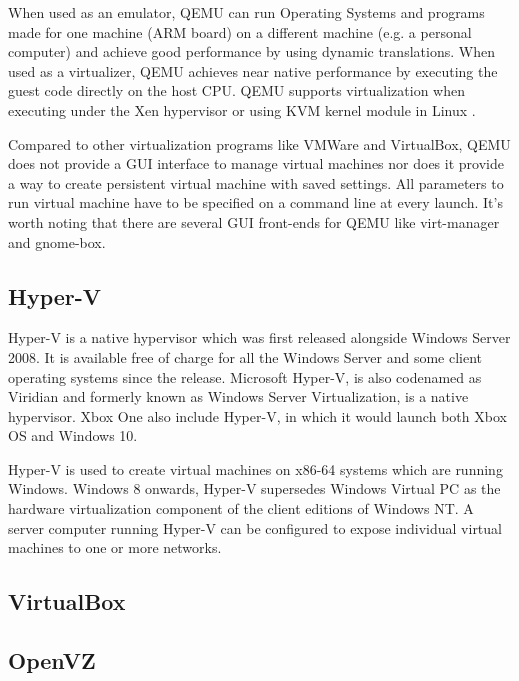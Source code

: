 {     When used as an emulator, QEMU can run Operating Systems and
     programs made for one machine (ARM board) on a different machine
     (e.g. a personal computer) and achieve good performance by using
     dynamic translations.  When used as a virtualizer, QEMU achieves
     near native performance by executing the guest code directly on
     the host CPU. QEMU supports virtualization when executing under
     the Xen hypervisor or using KVM kernel module in Linux
     \cite{www-qemuwiki}.

     Compared to other virtualization programs like VMWare and VirtualBox,
     QEMU does not provide a GUI interface to manage virtual machines nor
     does it provide a way to create persistent virtual machine with saved
     settings. All parameters to run virtual machine have to be specified
     on a command line at every launch. It’s worth noting that there are
     several GUI front-ends for QEMU like virt-manager and gnome-box.

     \pv

\subsection{Hyper-V \cv}
     
     Hyper-V is a native hypervisor which was first released alongside
     Windows Server 2008. It is available free of charge for all the
     Windows Server and some client operating systems since the
     release. Microsoft Hyper-V, is also codenamed as Viridian and
     formerly known as Windows Server Virtualization, is a native
     hypervisor. Xbox One also include Hyper-V, in which it would
     launch both Xbox OS and Windows 10. \cite{www-hyper-v-wikipedia}

     Hyper-V is used to create virtual machines on x86-64 systems
     which are running Windows. Windows 8 onwards, Hyper-V supersedes
     Windows Virtual PC as the hardware virtualization component of
     the client editions of Windows NT. A server computer running
     Hyper-V can be configured to expose individual virtual machines
     to one or more networks.

\subsection{VirtualBox}

\pv 

\subsection{OpenVZ \cv}

}
